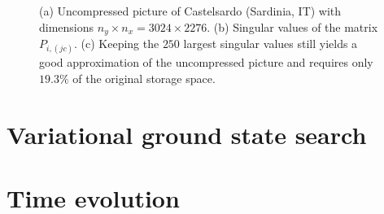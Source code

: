 \begin{figure}
    \hfil
    \caption{(a) Uncompressed picture of Castelsardo (Sardinia, IT) with dimensions $n_y\times n_x=3024\times2276$. (b) Singular values of the matrix $P_{i,(jc)}$. (c) Keeping the $250$ largest singular values still yields a good approximation of the uncompressed picture and requires only $19.3\%$ of the original storage space.}
    \label{fig:fock_spaces}
\end{figure}
%
%
\section{Variational ground state search}
\label{sec:variational_ground_state_search}
%
%
\section{Time evolution}
\label{sec:time_evolution}
%
%
%
%
